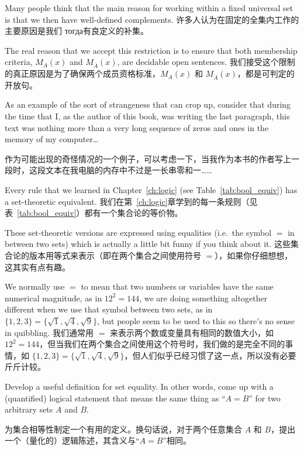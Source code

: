 Many people think that the main
reason for working within a fixed universal set is that we then 
have well-defined complements.
许多人认为在固定的全集内工作的主要原因是我们 тогда有良定义的补集。

The real reason that we accept
this restriction is to ensure that both membership criteria,
$M_A(x)$ and $M_{\overline{A}}(x)$, are decidable open sentences.
我们接受这个限制的真正原因是为了确保两个成员资格标准，$M_A(x)$ 和 $M_{\overline{A}}(x)$，都是可判定的开放句。

As an example of the sort of strangeness that can crop up, consider that
during the time that I, as the author of this book, was writing the 
last paragraph, this text was nothing more than a very long
sequence of zeros and ones in the memory of my computer\ldots

作为可能出现的奇怪情况的一个例子，可以考虑一下，当我作为本书的作者写上一段时，这段文本在我电脑的内存中不过是一长串零和一……

Every rule that we learned in Chapter~\ref{ch:logic} 
(see Table~\ref{tab:bool_equiv}) has a set-theoretic equivalent.
我们在第~\ref{ch:logic}章学到的每一条规则（见表~\ref{tab:bool_equiv}）都有一个集合论的等价物。

These set-theoretic versions are
expressed using equalities (i.e.\ the symbol $=$ in between two sets) which
is actually a little bit funny if you think about it.
这些集合论的版本用等式来表示（即在两个集合之间使用符号 $=$），如果你仔细想想，这其实有点有趣。

We normally
use $=$ to mean that two numbers or variables have the same numerical
magnitude, as in $12^2 = 144$, we are doing something altogether
different when we use that symbol between two sets, as in $\{1,2,3\}=
\{\sqrt{1},\sqrt{4},\sqrt{9}\}$, but people seem to be used to this
so there's no sense in quibbling.
我们通常用 $=$ 来表示两个数或变量具有相同的数值大小，如 $12^2 = 144$，但当我们在两个集合之间使用这个符号时，我们做的是完全不同的事情，如 $\{1,2,3\}=\{\sqrt{1},\sqrt{4},\sqrt{9}\}$，但人们似乎已经习惯了这一点，所以没有必要斤斤计较。
\begin{exer}
Develop a useful definition for set equality.  In other words,
come up with a (quantified) logical statement that means the
same thing as ``$A = B$'' for two arbitrary sets $A$ and $B$.

为集合相等性制定一个有用的定义。换句话说，对于两个任意集合 $A$ 和 $B$，提出一个（量化的）逻辑陈述，其含义与“$A = B$”相同。
\end{exer}

